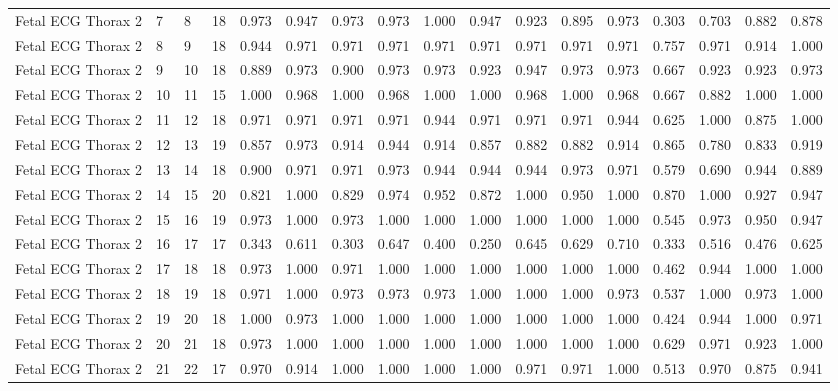 \begin{longtable}{lllllllllllllllll}
Fetal ECG Thorax 2 & 7 & 8 & 18 & 0.973 & 0.947 & 0.973 & 0.973 & 1.000 & 0.947 & 0.923 & 0.895 & 0.973 & 0.303 & 0.703 & 0.882 & 0.878 \\
Fetal ECG Thorax 2 & 8 & 9 & 18 & 0.944 & 0.971 & 0.971 & 0.971 & 0.971 & 0.971 & 0.971 & 0.971 & 0.971 & 0.757 & 0.971 & 0.914 & 1.000 \\
Fetal ECG Thorax 2 & 9 & 10 & 18 & 0.889 & 0.973 & 0.900 & 0.973 & 0.973 & 0.923 & 0.947 & 0.973 & 0.973 & 0.667 & 0.923 & 0.923 & 0.973 \\
Fetal ECG Thorax 2 & 10 & 11 & 15 & 1.000 & 0.968 & 1.000 & 0.968 & 1.000 & 1.000 & 0.968 & 1.000 & 0.968 & 0.667 & 0.882 & 1.000 & 1.000 \\
Fetal ECG Thorax 2 & 11 & 12 & 18 & 0.971 & 0.971 & 0.971 & 0.971 & 0.944 & 0.971 & 0.971 & 0.971 & 0.944 & 0.625 & 1.000 & 0.875 & 1.000 \\
Fetal ECG Thorax 2 & 12 & 13 & 19 & 0.857 & 0.973 & 0.914 & 0.944 & 0.914 & 0.857 & 0.882 & 0.882 & 0.914 & 0.865 & 0.780 & 0.833 & 0.919 \\
Fetal ECG Thorax 2 & 13 & 14 & 18 & 0.900 & 0.971 & 0.971 & 0.973 & 0.944 & 0.944 & 0.944 & 0.973 & 0.971 & 0.579 & 0.690 & 0.944 & 0.889 \\
Fetal ECG Thorax 2 & 14 & 15 & 20 & 0.821 & 1.000 & 0.829 & 0.974 & 0.952 & 0.872 & 1.000 & 0.950 & 1.000 & 0.870 & 1.000 & 0.927 & 0.947 \\
Fetal ECG Thorax 2 & 15 & 16 & 19 & 0.973 & 1.000 & 0.973 & 1.000 & 1.000 & 1.000 & 1.000 & 1.000 & 1.000 & 0.545 & 0.973 & 0.950 & 0.947 \\
Fetal ECG Thorax 2 & 16 & 17 & 17 & 0.343 & 0.611 & 0.303 & 0.647 & 0.400 & 0.250 & 0.645 & 0.629 & 0.710 & 0.333 & 0.516 & 0.476 & 0.625 \\
Fetal ECG Thorax 2 & 17 & 18 & 18 & 0.973 & 1.000 & 0.971 & 1.000 & 1.000 & 1.000 & 1.000 & 1.000 & 1.000 & 0.462 & 0.944 & 1.000 & 1.000 \\
Fetal ECG Thorax 2 & 18 & 19 & 18 & 0.971 & 1.000 & 0.973 & 0.973 & 0.973 & 1.000 & 1.000 & 1.000 & 0.973 & 0.537 & 1.000 & 0.973 & 1.000 \\
Fetal ECG Thorax 2 & 19 & 20 & 18 & 1.000 & 0.973 & 1.000 & 1.000 & 1.000 & 1.000 & 1.000 & 1.000 & 1.000 & 0.424 & 0.944 & 1.000 & 0.971 \\
Fetal ECG Thorax 2 & 20 & 21 & 18 & 0.973 & 1.000 & 1.000 & 1.000 & 1.000 & 1.000 & 1.000 & 1.000 & 1.000 & 0.629 & 0.971 & 0.923 & 1.000 \\
Fetal ECG Thorax 2 & 21 & 22 & 17 & 0.970 & 0.914 & 1.000 & 1.000 & 1.000 & 1.000 & 0.971 & 0.971 & 1.000 & 0.513 & 0.970 & 0.875 & 0.941 \\

\end{longtable}
